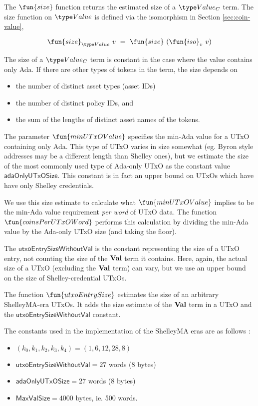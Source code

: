 The $\fun{size}$ function returns the estimated size of a $\Value_C$ term. The size
function on $\Value$ is defined via the isomorphism in Section \ref{sec:coin-value},

\[ \fun{size}_{\Value}~v~=~\fun{size}~(\fun{iso}_{v}~v) \]

The size of a $\Value_C$ term is constant in the case where the value contains only Ada.
If there are other types of tokens in the
term, the size depends on

\begin{itemize}
  \item the number of distinct asset types (asset IDs)
  \item the number of distinct policy IDs, and
  \item the sum of the lengths of distinct asset names of the tokens.
\end{itemize}

The parameter $\fun{minUTxOValue}$ specifies the min-Ada value for a UTxO containing
only Ada. This type of UTxO varies in size somewhat (eg. Byron style addresses
may be a different length than Shelley ones), but we estimate the size of the most commonly
used type of Ada-only UTxO as the constant value $\mathsf{adaOnlyUTxOSize}$.
This constant is in fact an upper bound on UTxOs which have have only Shelley credentials.

We use this size estimate
to calculate what $\fun{minUTxOValue}$ implies to be the min-Ada value requirement
\emph{per word} of UTxO data.
The function $\fun{coinsPerUTxOWord}$ performs this calculation by dividing the
min-Ada value by the Ada-only UTxO size (and taking the floor).

The $\mathsf{utxoEntrySizeWithoutVal}$ is the constant representing
the size of a UTxO entry, not counting the size of the $\mathbf{Val}$ term it contains.
Here, again, the actual size of a UTxO (excluding the $\mathbf{Val}$ term) can vary, but
we use an upper bound on the size of Shelley-credential UTxOs.

The function $\fun{utxoEntrySize}$ estimates the size of an arbitrary ShelleyMA-era
UTxOs. It adds the size estimate of the $\mathbf{Val}$ term in a UTxO and the
$\mathsf{utxoEntrySizeWithoutVal}$ constant.

The constants used in the implementation of the ShelleyMA eras are as follows :

\begin{itemize}
  \item $(k_0, k_1, k_2, k_3, k_4) = (1, 6, 12, 28, 8)$
  \item $\mathsf{utxoEntrySizeWithoutVal} = 27$ words (8 bytes)
  \item $\mathsf{adaOnlyUTxOSize} = 27$ words (8 bytes)
  \item $\mathsf{MaxValSize} = 4000$ bytes, ie. 500 words.
\end{itemize}
